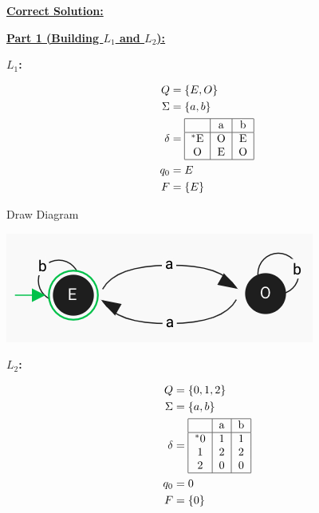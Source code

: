 \documentclass[12pt]{article}
\begin{document}
\begin{itemize}
    \bigskip

    \begin{mdframed}
    \underline{\textbf{Correct Solution:}}

    \bigskip

    \underline{\textbf{Part 1 (Building $L_1$ and $L_2$):}}

    \bigskip

    \textbf{$L_1$:}

    \bigskip

    \begin{align*}
        Q &= \{E,O\}\\
        \Sigma &= \{a,b\}\\
        \delta &= \begin{tabular}{|c|c|c|}
        \hline
          & a & b\\
        \hline
        $^*$E & O & E\\
        O & E & O\\
        \hline
        \end{tabular}\\
        q_0 &= E\\
        F &= \{E\}
    \end{align*}

    \bigskip

    Draw Diagram

    \begin{center}
    \includegraphics[width=0.7 \linewidth]{images/worksheet_8_solution_1.png}
    \end{center}

    \bigskip

    \textbf{$L_2$:}

    \bigskip

    \begin{align*}
        Q &= \{0,1,2\}\\
        \Sigma &= \{a,b\}\\
        \delta &= \begin{tabular}{|c|c|c|}
        \hline
              & a & b\\
        \hline
        $^*$0 & 1 & 1\\
        1     & 2 & 2\\
        2     & 0 & 0\\
        \hline
        \end{tabular}\\
        q_0 &= 0\\
        F &= \{0\}
    \end{align*}


\end{mdframed}
\end{itemize}
\end{document}
